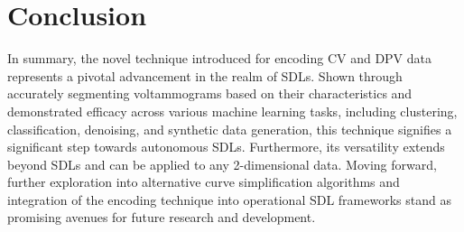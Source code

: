 \chapter{Conclusion} \label{chap:chap-5}
In summary, the novel technique introduced for encoding CV and DPV data represents a pivotal advancement in the realm of SDLs. Shown through accurately segmenting voltammograms based on their characteristics and demonstrated efficacy across various machine learning tasks, including clustering, classification, denoising, and synthetic data generation, this technique signifies a significant step towards autonomous SDLs. Furthermore, its versatility extends beyond SDLs and can be applied to any 2-dimensional data. Moving forward, further exploration into alternative curve simplification algorithms and integration of the encoding technique into operational SDL frameworks stand as promising avenues for future research and development.